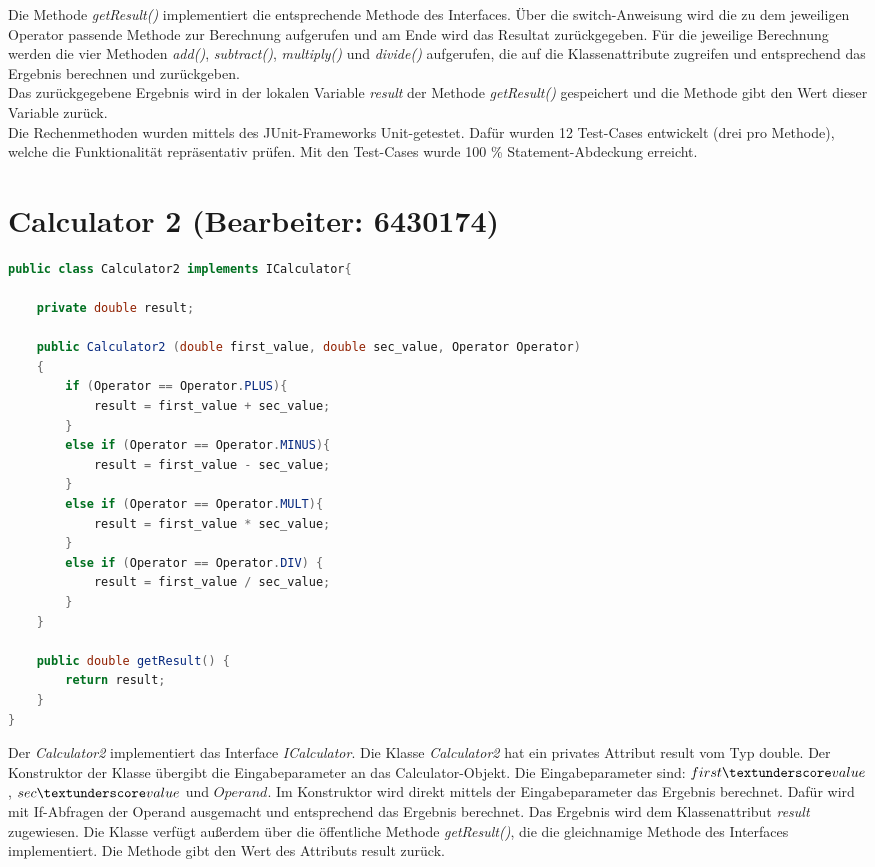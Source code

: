 Die Methode \textit{getResult()} implementiert die entsprechende Methode des Interfaces.
Über die switch-Anweisung wird die zu dem jeweiligen Operator passende Methode zur Berechnung aufgerufen und am Ende wird das Resultat zurückgegeben.
Für die jeweilige Berechnung werden die vier Methoden \textit{add()}, \textit{subtract()}, \textit{multiply()} und \textit{divide()} aufgerufen, die auf die Klassenattribute zugreifen und entsprechend das Ergebnis berechnen und zurückgeben.\\
Das zurückgegebene Ergebnis wird in der lokalen Variable \textit{result} der Methode \textit{getResult()} gespeichert und die Methode gibt den Wert dieser Variable zurück.\\
Die Rechenmethoden wurden mittels des JUnit-Frameworks Unit-getestet. Dafür wurden 12 Test-Cases entwickelt (drei pro Methode), welche die Funktionalität repräsentativ prüfen. Mit den Test-Cases wurde 100 \% Statement-Abdeckung erreicht.
\chapter{Calculator 2 (Bearbeiter: 6430174)}
\begin{lstlisting}[language=Java,basicstyle=\scriptsize, caption= Calculator 2]
public class Calculator2 implements ICalculator{

    private double result;

    public Calculator2 (double first_value, double sec_value, Operator Operator)
    {
        if (Operator == Operator.PLUS){
            result = first_value + sec_value;
        }
        else if (Operator == Operator.MINUS){
            result = first_value - sec_value;
        }
        else if (Operator == Operator.MULT){
            result = first_value * sec_value;
        }
        else if (Operator == Operator.DIV) {
            result = first_value / sec_value;
        }
    }

    public double getResult() {
        return result;
    }
}
\end{lstlisting}
Der \textit{Calculator2} implementiert das Interface \textit{ICalculator}. Die Klasse \textit{Calculator2} hat ein privates Attribut result vom Typ double. 
Der Konstruktor der Klasse übergibt die Eingabeparameter an das Calculator-Objekt. Die Eingabeparameter sind: $first\textunderscore value$, $sec\textunderscore value$ und $Operand$. Im Konstruktor wird direkt mittels der Eingabeparameter das Ergebnis berechnet. Dafür wird mit If-Abfragen der Operand ausgemacht und entsprechend das Ergebnis berechnet. Das Ergebnis wird dem Klassenattribut \textit{result} zugewiesen.
Die Klasse verfügt außerdem über die öffentliche Methode \textit{getResult()}, die die gleichnamige Methode des Interfaces implementiert. Die Methode gibt den Wert des Attributs result zurück.

